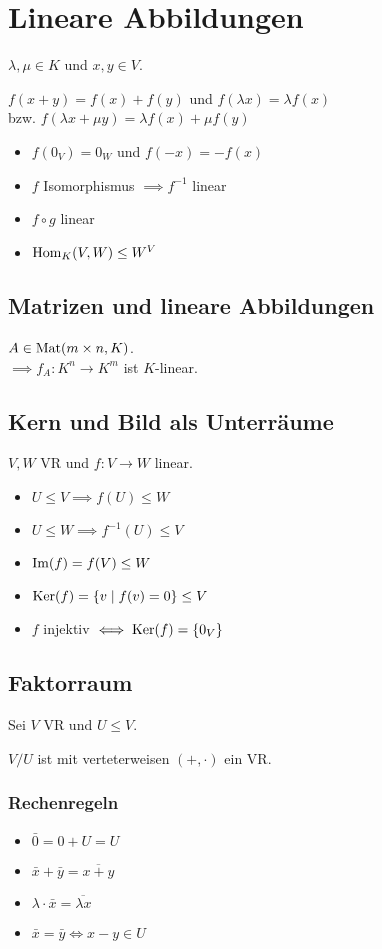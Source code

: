 \section*{Lineare Abbildungen}
$\lambda,\mu \in K$ und $x,y \in V$.

$f(x+y)=f(x)+f(y)$ und $f(\lambda x) = \lambda f(x)$ \\
bzw. $f(\lambda x + \mu y) = \lambda f(x) + \mu f (y)$

\begin{itemize}
	\item $f(0_V)=0_W$ und $f(-x) = -f(x)$
	\item $f$ Isomorphismus $\implies f^{-1}$ linear
	\item $f \circ g$ linear
	\item $\operatorname{Hom}_K(V,W) \le W^V$
\end{itemize}

\subsection*{Matrizen und lineare Abbildungen}
$A\in\operatorname{Mat}(m\times n, K)$.\\
$\implies f_A: K^n\to K^m$ ist $K$-linear.

\subsection*{Kern und Bild als Unterräume}
$V,W$ VR und $f:V\to W$ linear.
\begin{itemize}
	\item $U\le V \implies f(U)\le W$
	\item $U\le W \implies f^{-1}(U) \le V$
	\item $\operatorname{Im}(f)=f(V)\le W$
	\item $\operatorname{Ker}(f) = \{v \mid f(v)=0\} \le V$
	\item $f$ injektiv $\iff \operatorname{Ker}(f)=\{0_V\}$
\end{itemize}

\subsection*{Faktorraum}
Sei $V$ VR und $U \le V$.

$V/U$ ist mit verteterweisen $(+,\cdot)$ ein VR.

\subsubsection*{Rechenregeln}
\begin{itemize}
	\item $\bar 0 = 0 + U = U$
	\item $\bar x + \bar y = \overline{x+y}$
	\item $\lambda\cdot \bar x = \overline{\lambda x}$
	\item $\bar x = \bar y \iff x-y \in U$
\end{itemize}

